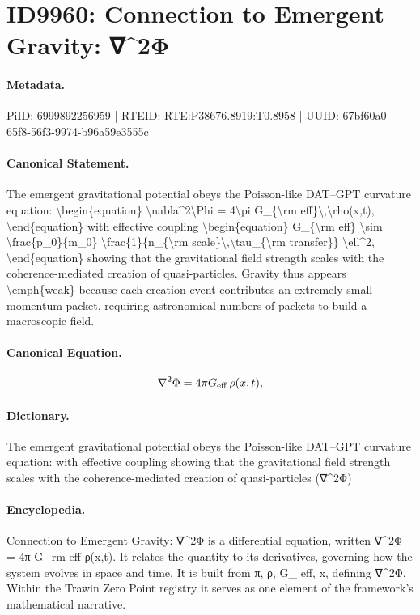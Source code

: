 \section*{ID9960: Connection to Emergent Gravity: ∇\textasciicircum{}2Φ}
\paragraph{Metadata.}
PiID: 6999892256959 | RTEID: RTE:P38676.8919:T0.8958 | UUID: 67bf60a0-65f8-56f3-9974-b96a59e3555c

\paragraph{Canonical Statement.}
The emergent gravitational potential obeys the Poisson-like DAT–GPT curvature equation: \textbackslash{}begin\{equation\} \textbackslash{}nabla\textasciicircum{}2\textbackslash{}Phi = 4\textbackslash{}pi G\_\{\textbackslash{}rm eff\}\textbackslash{},\textbackslash{}rho(x,t), \textbackslash{}end\{equation\} with effective coupling \textbackslash{}begin\{equation\} G\_\{\textbackslash{}rm eff\} \textbackslash{}sim \textbackslash{}frac\{p\_0\}\{m\_0\} \textbackslash{}frac\{1\}\{n\_\{\textbackslash{}rm scale\}\textbackslash{},\textbackslash{}tau\_\{\textbackslash{}rm transfer\}\} \textbackslash{}ell\textasciicircum{}2, \textbackslash{}end\{equation\} showing that the gravitational field strength scales with the coherence-mediated creation of quasi-particles. Gravity thus appears \textbackslash{}emph\{weak\} because each creation event contributes an extremely small momentum packet, requiring astronomical numbers of packets to build a macroscopic field.

\paragraph{Canonical Equation.}
\[
\nabla^2\Phi = 4\pi G_{\rm eff}\,\rho(x,t),
\]

\paragraph{Dictionary.}
The emergent gravitational potential obeys the Poisson-like DAT–GPT curvature equation: with effective coupling showing that the gravitational field strength scales with the coherence-mediated creation of quasi-particles (∇\textasciicircum{}2Φ)

\paragraph{Encyclopedia.}
Connection to Emergent Gravity: ∇\textasciicircum{}2Φ is a differential equation, written ∇\textasciicircum{}2Φ = 4π G\_rm eff ρ(x,t). It relates the quantity to its derivatives, governing how the system evolves in space and time. It is built from π, ρ, G\_ eff, x, defining ∇\textasciicircum{}2Φ. Within the Trawin Zero Point registry it serves as one element of the framework's mathematical narrative.
